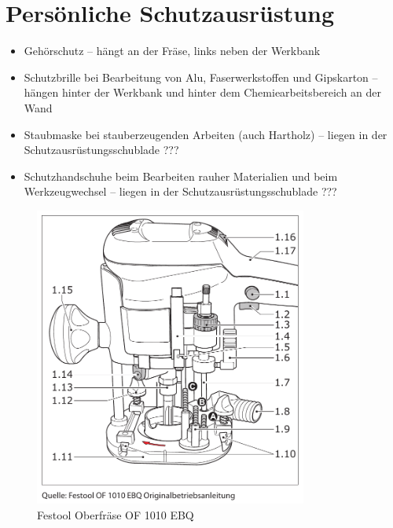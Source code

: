 \documentclass{\basedir/fablab-document}
\begin{document}
\section{Persönliche Schutzausrüstung}
\begin{itemize}
\item Gehörschutz -- hängt an der Fräse, links neben der Werkbank
\item Schutzbrille bei Bearbeitung von Alu, Faserwerkstoffen und Gipskarton -- hängen hinter der Werkbank und hinter dem Chemiearbeitsbereich an der Wand
\item Staubmaske bei stauberzeugenden Arbeiten (auch Hartholz) -- liegen in der Schutzausrüstungsschublade ???
\item Schutzhandschuhe beim Bearbeiten rauher Materialien und beim Werkzeugwechsel -- liegen in der Schutzausrüstungsschublade ???
\end{itemize}

\begin{figure}[h!]
    \centering
    \includegraphics[width=0.8\textwidth]{bilder/oberfraese-sketch}
    \caption{Festool Oberfräse OF 1010 EBQ}
    \label{fig:sketch}
\end{figure}
\end{document}
